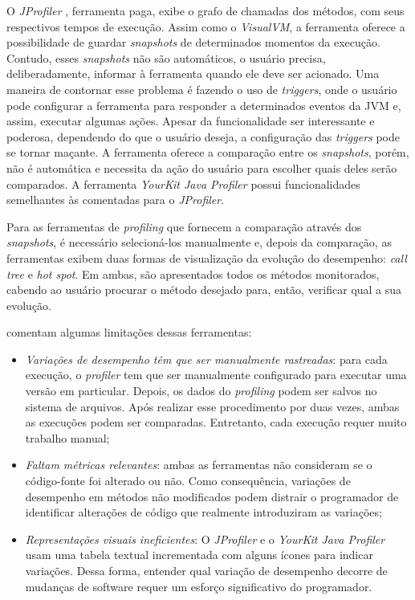 O \textit{JProfiler} \cite{JProfiler}, ferramenta paga, exibe o grafo de chamadas dos métodos, com seus respectivos tempos de execução. Assim como o \textit{VisualVM}, a ferramenta oferece a possibilidade de guardar \textit{snapshots} de determinados momentos da execução. Contudo, esses \textit{snapshots} não são automáticos, o usuário precisa, deliberadamente, informar à ferramenta quando ele deve ser acionado. Uma maneira de contornar esse problema é fazendo o uso de \textit{triggers}, onde o usuário pode configurar a ferramenta para responder a determinados eventos da JVM e, assim, executar algumas ações. Apesar da funcionalidade ser interessante e poderosa, dependendo do que o usuário deseja, a configuração das \textit{triggers} pode se tornar maçante. A ferramenta oferece a comparação entre os \textit{snapshots}, porém, não é automática e necessita da ação do usuário para escolher quais deles serão comparados. A ferramenta \textit{YourKit Java Profiler} \cite{Profiler2016} possui funcionalidades semelhantes às comentadas para o \textit{JProfiler}.

Para as ferramentas de \textit{profiling} que fornecem a comparação através dos \textit{snapshots}, é necessário selecioná-los manualmente e, depois da comparação, as ferramentas exibem duas formas de visualização da evolução do desempenho: \textit{call tree} e \textit{hot spot}. Em ambas, são apresentados todos os métodos monitorados, cabendo ao usuário procurar o método desejado para, então, verificar qual a sua evolução.

\citeauthor{SandovalAlcocer2013} comentam algumas limitações dessas ferramentas:
\begin{itemize}
	\item \textit{Variações de desempenho têm que ser manualmente rastreadas}: para cada execução, o \textit{profiler} tem que ser manualmente configurado para executar uma versão em particular. Depois, os dados do \textit{profiling} podem ser salvos no sistema de arquivos. Após realizar esse procedimento por duas vezes, ambas as execuções podem ser comparadas. Entretanto, cada execução requer muito trabalho manual;
	\item \textit{Faltam métricas relevantes}: ambas as ferramentas não consideram se o código-fonte foi alterado ou não. Como consequência, variações de desempenho em métodos não modificados podem distrair o programador de identificar alterações de código que realmente introduziram as variações;
	\item \textit{Representações visuais ineficientes}: O \textit{JProfiler} e o \textit{YourKit Java Profiler} usam uma tabela textual incrementada com alguns ícones para indicar variações. Dessa forma, entender qual variação de desempenho decorre de mudanças de software requer um esforço significativo do programador.
\end{itemize}

